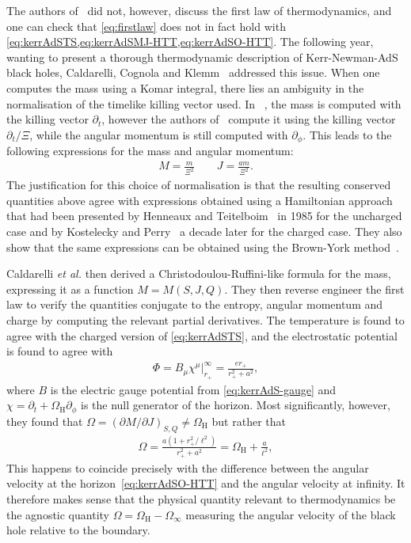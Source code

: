\documentclass[
twoside,
openright,
frontopenright
]{dmathesis}
\begin{document}
The authors of~\cite{Hawking:1998kw} did not, however, discuss the first law of
thermodynamics, and one can check that \cref{eq:firstlaw} does not in fact hold
with \cref{eq:kerrAdSTS,eq:kerrAdSMJ-HTT,eq:kerrAdSO-HTT}. The following year,
wanting to present a thorough thermodynamic description of Kerr-Newman-AdS black
holes, Caldarelli, Cognola and Klemm~\cite{Caldarelli:1999xj} addressed this
issue. When one computes the mass using a Komar integral, there lies an
ambiguity in the normalisation of the timelike killing vector used. In
~\cite{Hawking:1998kw}, the mass is computed with the killing vector
$\partial_t$, however the authors of~\cite{Caldarelli:1999xj} compute it using
the killing vector $\partial_t/\Xi$, while the angular momentum is still
computed with $\partial_\phi$. This leads to the following expressions for
the mass and angular momentum:
\begin{align}
  \label{eq:kerrAdSMJ-CCK}
  M=\frac{m}{\Xi^2} \qquad J=\frac{am}{\Xi^2}.
\end{align}
The justification for this choice of normalisation is that the resulting
conserved quantities above agree with expressions obtained using a Hamiltonian
approach that had been presented by Henneaux and
Teitelboim~\cite{Henneaux:1985tv} in 1985 for the uncharged case and by
Kostelecky and Perry~\cite{Kostelecky:1995ei} a decade later for the charged
case. They also show that the same expressions can be obtained using the
Brown-York method~\cite{Brown:1992br}.

Caldarelli \emph{et al.} then derived a Christodoulou-Ruffini-like formula for the
mass, expressing it as a function $M=M(S, J, Q)$. They then reverse engineer the
first law to verify the quantities conjugate to the entropy, angular momentum
and charge by computing the relevant partial derivatives. The temperature is
found to agree with the charged version of \cref{eq:kerrAdSTS}, and the
electrostatic potential is found to agree with
\begin{align}
  \label{eq:kerrAdSP-CCK}
  \Phi = B_\mu\chi^\mu\Big|^\infty_{r_+}=\frac{er_+}{r_+^2+a^2},
\end{align}
where $B$ is the electric gauge potential from \cref{eq:kerrAdS-gauge} and
$\chi=\partial_t+\Omega_\mathrm{H}\partial_\phi$ is the null generator of the
horizon. Most significantly, however, they found that $\Omega = (\partial
M/\partial J)_{S,Q}\neq \Omega_\mathrm{H}$ but rather that
\begin{align}
  \label{eq:kerrAdSO-CCK}
  \Omega = \frac{a(1+r_+^2/\ell^2)}{r_+^2+a^2}=\Omega_\mathrm{H}+\frac{a}{\ell^2},
\end{align}
This happens to coincide precisely with the difference between the angular
velocity at the horizon~\eqref{eq:kerrAdSO-HTT} and the angular velocity at
infinity. It therefore makes sense that the physical quantity relevant to
thermodynamics be the agnostic quantity $\Omega =
\Omega_\mathrm{H}-\Omega_\infty$ measuring the angular velocity of the black
hole relative to the boundary.
\end{document}
